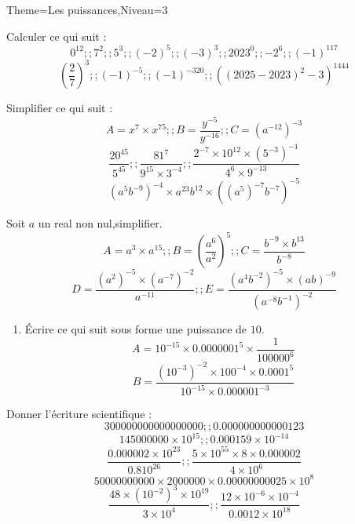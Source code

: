 \documentclass[a4paper,12pt]{article}
\begin{document}
\begin{Maquette}[Fiche]{Theme=Les puissances,Niveau=3}

\begin{exercice}
Calculer ce qui suit :
$$0^{12};;7^{2};;5^{3};;(-2)^{5};;(-3)^{3};;2023^{0};;-2^{6};;(-1)^{117} $$
$$\left(\dfrac{2}{7}\right)^{3};;(-1)^{-5};;(-1)^{-320};;\left(\left(2025-2023\right)^{2}-3\right)^{1444} $$

\end{exercice}

\begin{exercice}
Simplifier ce qui suit :
$$ A=x^{7}\times x^{75};; B=\dfrac{y^{-5}}{y^{-16}};; C=(a^{-12})^{-3}$$
$$ \dfrac{20^{45}}{5^{45}};; \dfrac{81^{7}}{9^{15}\times 3^{-4}};; \dfrac{2^{-7}\times 10^{12}\times (5^{-3})^{-1}}{4^{6}\times 9^{-13}}$$
$$(a^{5}b^{-9})^{-4}\times a^{23}b^{12}\times((a^{5})^{-7}b^{-7})^{-5} $$

\end{exercice}

\begin{exercice}
Soit $a$ un real non nul,simplifier.
$$A=a^{3}\times a^{15};; B=\left(\frac{a^{6}}{a^{2}}\right)^{5};; C=\frac{b^{-9}\times b^{13}}{b^{-8}} $$
$$D=\dfrac{\left(a^{2}\right)^{-5}\times \left(a^{-7}\right)^{-2}}{a^{-11}};;E=\dfrac{\left(a^{4}b^{-2}\right)^{-5}\times \left(ab\right)^{-9}}{\left(a^{-8}b^{-1}\right)^{-2}} $$
\end{exercice}

\begin{exercice}
\begin{enumerate}
\item \'Ecrire ce qui suit sous forme une puissance de $10$.
$$A=10^{-15}\times 0.0000001^{5}\times \dfrac{1}{100000^{6}} $$
$$B=\dfrac{\left(10^{-3}\right)^{-2}\times 100^{-4}\times 0.0001^{5}}{10^{-15}\times 0.000001^{-3}} $$
\end{enumerate}
\end{exercice}

\begin{exercice}
Donner l'écriture scientifique :
$$300000000000000000 ;; 0.000000000000123 $$
$$145000000 \times 10^{15} ;; 0.000159 \times 10^{-14}$$
$$\dfrac{0.000002 \times 10^{23}}{0.8 10^{26}} ;; \dfrac{5\times 10^{55}\times 8\times 0.000002}{4\times 10^{6}}$$
$$50000000000\times 2000000\times 0.00000000025\times 10^{8} $$
$$\dfrac{48\times (10^{-2})^{3}\times 10^{19}}{3\times 10^{4}};;
\dfrac{12\times 10^{-6}\times 10^{-4}}{0.0012 \times 10^{18}} $$

\end{exercice}

\end{Maquette}
\end{document}
